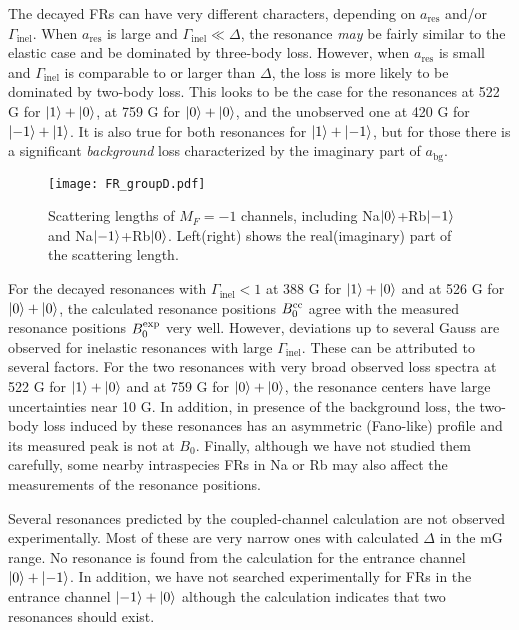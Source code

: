 The decayed FRs can have very different characters, depending on $a_\textrm{res}$ and/or $\Gamma_\textrm{inel}$. When $a_\textrm{res}$ is large and $\Gamma_\textrm{inel}\ll\Delta$, the resonance \emph{may} be fairly similar to the elastic case and be dominated by three-body loss. However, when $a_\textrm{res}$ is small and $\Gamma_\textrm{inel}$ is comparable to or larger than $\Delta$, the loss is more likely to be dominated by two-body loss. This looks to be the case for the resonances at 522 G for $\ket{1}+\ket{0}$, at 759 G for $\ket{0}+\ket{0}$, and the unobserved one at 420 G for $\ket{-1}+\ket{1}$. It is also true for both resonances for $\ket{1}+\ket{-1}$, but for those there is a significant \emph{background} loss characterized by the imaginary part of $a_\textrm{bg}$.

\begin{figure}[htb]
\begin{center}
\texttt{[image: FR\_groupD.pdf]}
\end{center}
\caption[Scattering lengths of $M_F=-1$ channels]{Scattering lengths of $M_F=-1$ channels, including Na$\ket{0}$+Rb$\ket{-1}$ and Na$\ket{-1}$+Rb$\ket{0}$. Left(right) shows the real(imaginary) part of the scattering length.}
\label{FR_groupD}
\end{figure}

For the decayed resonances with $\Gamma_\textrm{inel} <1$ at 388 G for $\ket{1}+\ket{0}$ and at 526 G for $\ket{0}+\ket{0}$, the calculated resonance positions $B_0^{\rm cc}$ agree with the measured resonance positions $B_0^{\rm exp}$ very well. However, deviations up to several Gauss are observed for inelastic resonances with large $\Gamma_\textrm{inel}$. These can be attributed to several factors. For the two resonances with very broad observed loss spectra at 522 G for $\ket{1}+\ket{0}$ and at 759 G for $\ket{0}+\ket{0}$, the resonance centers have large uncertainties near 10 G. In addition, in presence of the background loss, the two-body loss induced by these resonances has an asymmetric (Fano-like) profile and its measured peak is not at $B_0$. Finally, although we have not studied them carefully, some nearby intraspecies FRs in Na or Rb may also affect the measurements of the resonance positions.

Several resonances predicted by the coupled-channel calculation are not observed experimentally. Most of these are very narrow ones with calculated $\Delta$ in the mG range. No resonance is found from the calculation for the entrance channel $\ket{0}+\ket{-1}$. In addition, we have not searched experimentally for FRs in the entrance channel $\ket{-1}+\ket{0}$ although the calculation indicates that two resonances should exist.

